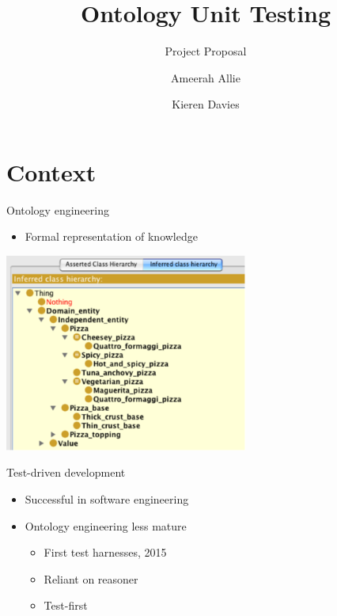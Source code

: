 \documentclass[17pt,mathserif]{beamer}
\begin{document}
\title{Ontology Unit Testing}
\subtitle{Project Proposal}
\author{Ameerah Allie \and Kieren Davies}
\date{}
\titlepage


\section{Context}

\begin{frame}{Ontology engineering}
  \begin{itemize}
    \item Formal representation of knowledge
  \end{itemize}
  \centering
  \includegraphics[width=0.6\textwidth]{pizza}
\end{frame}

\begin{frame}{Test-driven development}
  \begin{itemize}
    \item Successful in software engineering
    \item Ontology engineering less mature
    \begin{itemize}
      \item First test harnesses, 2015
      \item Reliant on reasoner
      \item Test-first
    \end{itemize}
  \end{itemize}
\end{frame}
\end{document}
